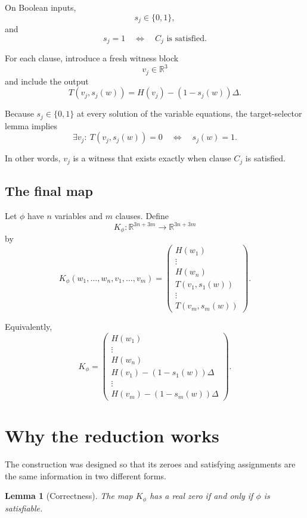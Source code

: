\documentclass[11pt]{article}
\newtheorem{lemma}[theorem]{Lemma}
\newcommand{\R}{\mathbb{R}}
\begin{document}
On Boolean inputs,
\[
s_j\in\{0,1\},
\]
and
\[
s_j=1
\quad\Longleftrightarrow\quad
C_j\text{ is satisfied}.
\]

For each clause, introduce a fresh witness block
\[
v_j\in\R^3
\]
and include the output
\[
T(v_j,s_j(w))=H(v_j)-(1-s_j(w))\Delta.
\]

Because $s_j\in\{0,1\}$ at every solution of the variable equations, the
target-selector lemma implies
\[
\exists v_j:\ T(v_j,s_j(w))=0
\quad\Longleftrightarrow\quad
s_j(w)=1.
\]

In other words, $v_j$ is a witness that exists exactly when clause $C_j$ is
satisfied.

\subsection{The final map}

Let $\phi$ have $n$ variables and $m$ clauses. Define
\[
K_\phi:
\R^{3n+3m}
\longrightarrow
\R^{3n+3m}
\]
by
\[
K_\phi
\left(
w_1,\dots,w_n,
v_1,\dots,v_m
\right)=
\begin{pmatrix}
H(w_1)
\\
\vdots
\\
H(w_n)
\\
T(v_1,s_1(w))
\\
\vdots
\\
T(v_m,s_m(w))
\end{pmatrix}.
\]

Equivalently,
\[
K_\phi=
\begin{pmatrix}
H(w_1)
\\
\vdots
\\
H(w_n)
\\
H(v_1)-(1-s_1(w))\Delta
\\
\vdots
\\
H(v_m)-(1-s_m(w))\Delta
\end{pmatrix}.
\]

\section{Why the reduction works}

The construction was designed so that its zeroes and satisfying assignments
are the same information in two different forms.

\begin{lemma}[Correctness]
The map $K_\phi$ has a real zero if and only if $\phi$ is satisfiable.
\end{lemma}
\end{document}
